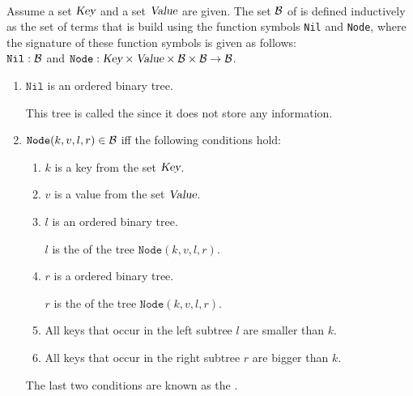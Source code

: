 \begin{Definition} \hspace*{\fill} \\
  Assume a set $\textsl{Key}$ and a set $\textsl{Value}$ are given.
  The set $\mathcal{B}$ of  is defined inductively as the set
  of terms that is build using the function symbols \texttt{Nil} and \texttt{Node}, where the signature of
  these function symbols is given as follows: \\[0.2cm]
  \hspace*{1.3cm} 
  $\texttt{Nil}: \mathcal{B}$ \qquad and \qquad  $\texttt{Node}: \textsl{Key} \times \textsl{Value} \times \mathcal{B} \times \mathcal{B} \rightarrow \mathcal{B}$.
  \begin{enumerate}
  \item $\texttt{Nil}$ is an ordered binary tree.

        This tree is called the  since it does not store any information.
  \item $\texttt{Node}(k, v, l, r) \in \mathcal{B}$ \quad iff the following conditions hold:
        \begin{enumerate}
        \item $k$ is a key from the set $\textsl{Key}$.
        \item $v$ is a value from the set $\textsl{Value}$.
        \item $l$ is an ordered binary tree.

              $l$ is the   of the tree $\texttt{Node}(k, v, l, r)$.
        \item $r$ is a ordered binary tree.

              $r$ is the  of the tree $\texttt{Node}(k, v, l, r)$.
        \item All keys that occur in the left subtree $l$ are smaller than $k$.
        \item All keys that occur in the right subtree $r$ are bigger than $k$.
        \end{enumerate}
        The last two conditions are known as the .
        \eox
\end{enumerate}
\end{Definition}


